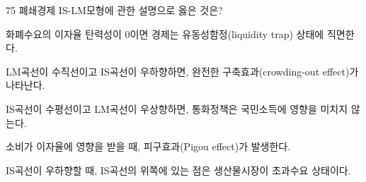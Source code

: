 \begin{question}{75}
폐쇄경제 IS-LM모형에 관한 설명으로 옳은 것은?
\begin{choices}
  \item 화폐수요의 이자율 탄력성이 0이면 경제는 유동성함정(liquidity trap) 상태에 직면한다.
  \item LM곡선이 수직선이고 IS곡선이 우하향하면, 완전한 구축효과(crowding-out effect)가 나타난다.
  \item IS곡선이 수평선이고 LM곡선이 우상향하면, 통화정책은 국민소득에 영향을 미치지 않는다.
  \item 소비가 이자율에 영향을 받을 때, 피구효과(Pigou effect)가 발생한다.
  \item IS곡선이 우하향할 때, IS곡선의 위쪽에 있는 점은 생산물시장이 초과수요 상태이다.
\end{choices}
\end{question}
